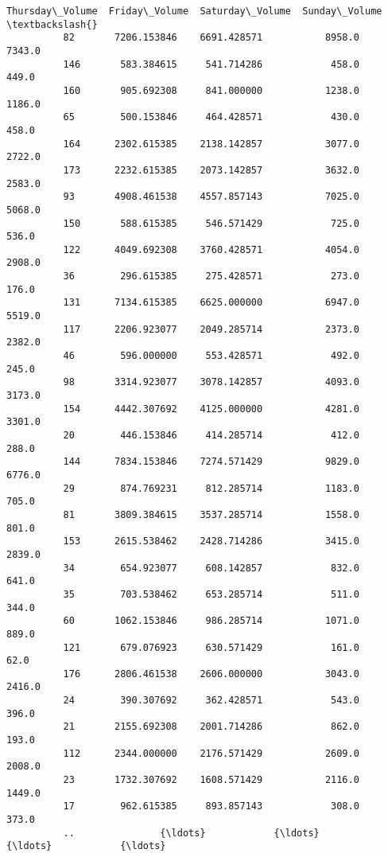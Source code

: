 \documentclass[11pt]{article}
\begin{document}
\begin{Verbatim}[commandchars=\\\{\}]
               Thursday\_Volume  Friday\_Volume  Saturday\_Volume  Sunday\_Volume  \textbackslash{}
          82       7206.153846    6691.428571           8958.0         7343.0   
          146       583.384615     541.714286            458.0          449.0   
          160       905.692308     841.000000           1238.0         1186.0   
          65        500.153846     464.428571            430.0          458.0   
          164      2302.615385    2138.142857           3077.0         2722.0   
          173      2232.615385    2073.142857           3632.0         2583.0   
          93       4908.461538    4557.857143           7025.0         5068.0   
          150       588.615385     546.571429            725.0          536.0   
          122      4049.692308    3760.428571           4054.0         2908.0   
          36        296.615385     275.428571            273.0          176.0   
          131      7134.615385    6625.000000           6947.0         5519.0   
          117      2206.923077    2049.285714           2373.0         2382.0   
          46        596.000000     553.428571            492.0          245.0   
          98       3314.923077    3078.142857           4093.0         3173.0   
          154      4442.307692    4125.000000           4281.0         3301.0   
          20        446.153846     414.285714            412.0          288.0   
          144      7834.153846    7274.571429           9829.0         6776.0   
          29        874.769231     812.285714           1183.0          705.0   
          81       3809.384615    3537.285714           1558.0          801.0   
          153      2615.538462    2428.714286           3415.0         2839.0   
          34        654.923077     608.142857            832.0          641.0   
          35        703.538462     653.285714            511.0          344.0   
          60       1062.153846     986.285714           1071.0          889.0   
          121       679.076923     630.571429            161.0           62.0   
          176      2806.461538    2606.000000           3043.0         2416.0   
          24        390.307692     362.428571            543.0          396.0   
          21       2155.692308    2001.714286            862.0          193.0   
          112      2344.000000    2176.571429           2609.0         2008.0   
          23       1732.307692    1608.571429           2116.0         1449.0   
          17        962.615385     893.857143            308.0          373.0   
          ..               {\ldots}            {\ldots}              {\ldots}            {\ldots}   

\end{Verbatim}
\end{document}
